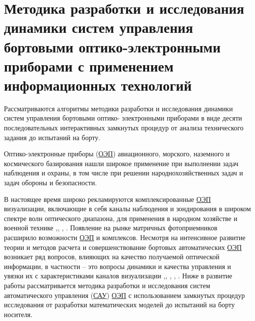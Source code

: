 \chapter{Методика разработки и исследования динамики систем управления бортовыми оптико-электронными приборами с применением информационных технологий} \label{ch:ch2}

\begin{comment}
В настоящее время наиболее распространены в народном хозяйстве и военной технике комплексированные оптико - электронные системы (КОЭП) визуализации, включающие в себя каналы наблюдения и зондирования в широком спектре волн оптического диапазона \cite[]{Tarasov},\cite[]{Belyakov},\cite[]{Karpov},\cite[]{Torshina}. Появление на рынке матричных фотоприемников расширило возможности КОЭП и К(комплексов). Несмотря на интенсивное развитие теории и методов расчета и совершенствование бортовых автоматических КОЭП и К возникают ряд вопросов, влияющих на качество получаемой оптической информации, в частности – это вопросы динамики и качества управления и увязки их с оптическими характеристиками каналов визуализации \cite[]{Belyakov},\cite[]{Karpov}, \cite[]{Baloev16}, \cite[]{Karpov17}.
\end{comment}

Рассматриваются алгоритмы методики разработки и исследования динамики систем управления бортовыми оптико- электронными приборами в виде десяти последовательных интерактивных замкнутых процедур от анализа технического задания до испытаний на борту.

Оптико-электронные приборы (\hyperref[acroEOS]{ОЭП}) авиационного, морского, наземного и космического базирования нашли широкое применение при выполнении задач наблюдения и охраны, в том числе при решении народнохозяйственных задач и задач обороны и безопасности.

В настоящее время широко рекламируются комплексированные \hyperref[acroEOS]{ОЭП} визуализации, включающие в себя каналы наблюдения и зондирования в широком спектре волн оптического диапазона, для применения в народном хозяйстве и военной технике \cite[]{Tarasov},\cite[]{Belyakov}, \cite[]{Torshina}, \cite[]{Ivanov18}. Появление на рынке матричных фотоприемников расширило возможности \hyperref[acroEOS]{ОЭП} и комплексов. Несмотря на интенсивное развитие теории и методов расчета и совершенствование бортовых автоматических \hyperref[acroEOS]{ОЭП} возникает ряд вопросов, влияющих на качество получаемой оптической информации, в частности – это вопросы динамики и качества управления и увязки их с характеристиками каналов визуализации \cite[]{Tarasov},\cite[]{Belyakov}, \cite[]{Baloev16}, \cite[]{Karpov17}, \cite[]{Gerasin19}. Ниже в развитие работы \cite[]{Tarasov} рассматривается методика разработки и исследования систем автоматического управления (\hyperref[acroSAU]{САУ}) \hyperref[acroEOS]{ОЭП} с использованием замкнутых процедур исследования от разработки математических моделей до испытаний на борту носителя.


